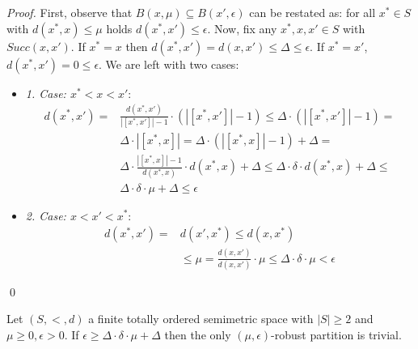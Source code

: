 \begin{proof}
    First, observe that $B(x, \mu) \subseteq B(x', \epsilon)$ can be restated as: for all $x^* \in S$ with $d(x^*,x) \leq \mu$ holds $d(x^*,x') \leq \epsilon$. Now, fix any $x^*, x, x' \in S$ with $Succ(x,x')$. If $x^* = x$ then $d(x^*, x') = d(x, x') \leq \Delta \leq \epsilon$. If $x^* = x'$, $d(x^*, x') = 0 \leq \epsilon$. We are left with two cases:
    \begin{itemize}
        \item \textit{1. Case: $x^* < x < x'$}: 
                    \begin{align*}
                        d(x^*,x') = & \frac{d(x^*,x')}{|[x^*,x']| - 1} \cdot (|[x^*, x']| - 1) \leq \Delta \cdot (|[x^*, x']| - 1) = \\
                                 & \Delta \cdot |[x^*,x]| = \Delta \cdot (|[x^*,x]| - 1) + \Delta = \\
                                 & \Delta \cdot \frac{|[x^*,x]| - 1}{d(x^*,x)} \cdot d(x^*,x) + \Delta \leq \Delta \cdot \delta \cdot d(x^*,x) + \Delta \leq \\
                                 & \Delta \cdot \delta \cdot \mu + \Delta \leq \epsilon
                    \end{align*}
        \item \textit{2. Case: $x < x' < x^*$}:
                    \begin{align*}
                        d(x^*, x') = &d(x', x^*) \leq d(x, x^*) \\
                                    & \leq \mu = \frac{d(x,x')}{d(x,x')} \cdot \mu \leq \Delta \cdot \delta \cdot \mu < \epsilon
                    \end{align*}
    \end{itemize}
    \qed
\end{proof}
\begin{corollary}
\label{cor:bounds-total}
    Let $(S, <, d)$ a finite totally ordered semimetric space with $|S| \geq 2$ and $\mu \geq 0, \epsilon > 0$. If $\epsilon \geq \Delta \cdot \delta \cdot \mu + \Delta$ then the only $(\mu, \epsilon)$-robust partition is trivial. 
\end{corollary}
